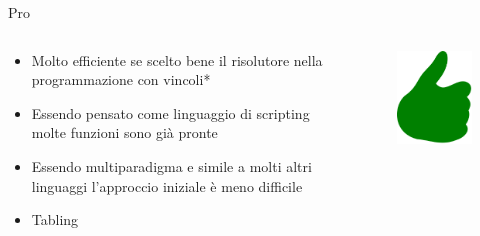 \begin{frame}{Pro}

	\begin{columns}

		\begin{column}{1\textwidth}

			\begin{itemize}
				\item Molto efficiente se scelto bene il risolutore nella programmazione con vincoli*
				\item Essendo pensato come linguaggio di scripting molte funzioni sono già pronte
				\item Essendo multiparadigma e simile a molti altri linguaggi l'approccio iniziale è meno difficile
				\item Tabling
			\end{itemize}

		\end{column}

		\begin{column}{0.1\textwidth}
			\begin{figure}
				\vspace*{-5cm}
				\hspace*{-1.5cm}
				\includegraphics[scale=0.3]{res/pro}
			\end{figure}
		\end{column}

	\end{columns}

\end{frame}